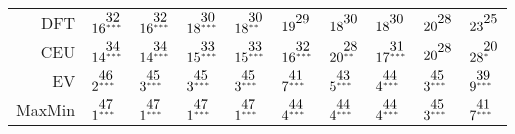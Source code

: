 \begin{table}[!htb]
\begin{tabular}{rlllllllll}
  DFT & $16^{\stackrel{\textstyle32\hfill}{\scriptscriptstyle***\hfill}}$ & $16^{\stackrel{\textstyle32\hfill}{\scriptscriptstyle***\hfill}}$ & $18^{\stackrel{\textstyle30\hfill}{\scriptscriptstyle***\hfill}}$ & $18^{\stackrel{\textstyle30\hfill}{\scriptscriptstyle**\hfill}}$ & $19^{\stackrel{\textstyle29\hfill}{\scriptscriptstyle\hfill}}$ & $18^{\stackrel{\textstyle30\hfill}{\scriptscriptstyle\hfill}}$ & $18^{\stackrel{\textstyle30\hfill}{\scriptscriptstyle\hfill}}$ & $20^{\stackrel{\textstyle28\hfill}{\scriptscriptstyle\hfill}}$ & $23^{\stackrel{\textstyle25\hfill}{\scriptscriptstyle\hfill}}$ \\ 
  CEU & $14^{\stackrel{\textstyle34\hfill}{\scriptscriptstyle***\hfill}}$ & $14^{\stackrel{\textstyle34\hfill}{\scriptscriptstyle***\hfill}}$ & $15^{\stackrel{\textstyle33\hfill}{\scriptscriptstyle***\hfill}}$ & $15^{\stackrel{\textstyle33\hfill}{\scriptscriptstyle***\hfill}}$ & $16^{\stackrel{\textstyle32\hfill}{\scriptscriptstyle***\hfill}}$ & $20^{\stackrel{\textstyle28\hfill}{\scriptscriptstyle**\hfill}}$ & $17^{\stackrel{\textstyle31\hfill}{\scriptscriptstyle***\hfill}}$ & $20^{\stackrel{\textstyle28\hfill}{\scriptscriptstyle\hfill}}$ & $28^{\stackrel{\textstyle20\hfill}{\scriptscriptstyle*\hfill}}$ \\ 
  EV & $2^{\stackrel{\textstyle46\hfill}{\scriptscriptstyle***\hfill}}$ & $3^{\stackrel{\textstyle45\hfill}{\scriptscriptstyle***\hfill}}$ & $3^{\stackrel{\textstyle45\hfill}{\scriptscriptstyle***\hfill}}$ & $3^{\stackrel{\textstyle45\hfill}{\scriptscriptstyle***\hfill}}$ & $7^{\stackrel{\textstyle41\hfill}{\scriptscriptstyle***\hfill}}$ & $5^{\stackrel{\textstyle43\hfill}{\scriptscriptstyle***\hfill}}$ & $4^{\stackrel{\textstyle44\hfill}{\scriptscriptstyle***\hfill}}$ & $3^{\stackrel{\textstyle45\hfill}{\scriptscriptstyle***\hfill}}$ & $9^{\stackrel{\textstyle39\hfill}{\scriptscriptstyle***\hfill}}$ \\ 
  MaxMin & $1^{\stackrel{\textstyle47\hfill}{\scriptscriptstyle***\hfill}}$ & $1^{\stackrel{\textstyle47\hfill}{\scriptscriptstyle***\hfill}}$ & $1^{\stackrel{\textstyle47\hfill}{\scriptscriptstyle***\hfill}}$ & $1^{\stackrel{\textstyle47\hfill}{\scriptscriptstyle***\hfill}}$ & $4^{\stackrel{\textstyle44\hfill}{\scriptscriptstyle***\hfill}}$ & $4^{\stackrel{\textstyle44\hfill}{\scriptscriptstyle***\hfill}}$ & $4^{\stackrel{\textstyle44\hfill}{\scriptscriptstyle***\hfill}}$ & $3^{\stackrel{\textstyle45\hfill}{\scriptscriptstyle***\hfill}}$ & $7^{\stackrel{\textstyle41\hfill}{\scriptscriptstyle***\hfill}}$ \\ 

\end{tabular}
\end{table}

